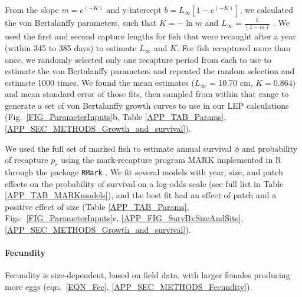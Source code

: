 \documentclass[12pt, oneside]{article}   	%
\begin{document}
From the slope $m = e^{(-K)}$ and y-intercept $b = L_\infty[1 - e^{(-K)}]$, we calculated the von Bertalanffy parameters, such that $K = -\ln m$ and $L_\infty = \frac{b}{(1-m)}$ \citep{hart2009estimating}. We used the first and second capture lengths for fish that were recaught after a year (within 345 to 385 days) to estimate $L_\infty$ and $K$. For fish recaptured more than once, we randomly selected only one recapture period from each to use to estimate the von Bertalanffy parameters and repeated the random selection and estimate 1000 times. We found the mean estimates ($L_\infty$ = 10.70 cm, $K = 0.864$) and mean standard error of those fits, then sampled from within that range to generate a set of von Bertalanffy growth curves to use in our LEP calculations (Fig.\ \ref{FIG_ParameterInputs}b, Table \ref{APP_TAB_Params}, \ref{APP_SEC_METHODS_Growth_and_survival}). 

We used the full set of marked fish to estimate annual survival $\phi$ and probability of recapture $p_r$ using the mark-recapture program MARK implemented in R through the package \texttt{RMark} \citep{RMark_Laake2013}. We fit several models with year, size, and patch effects on the probability of survival on a log-odds scale (see full list in Table \ref{APP_TAB_MARKmodels}), and the best fit had an effect of patch and a positive effect of size (Table \ref{APP_TAB_Params}, Figs.\ \ref{FIG_ParameterInputs}c, \ref{APP_FIG_SurvBySizeAndSite}, \ref{APP_SEC_METHODS_Growth_and_survival}). 

\paragraph*{Fecundity}

Fecundity is size-dependent, based on field data, with larger females producing more eggs (eqn.\ \ref{EQN_Fec}, \ref{APP_SEC_METHODS_Fecundity}).

\end{document}

